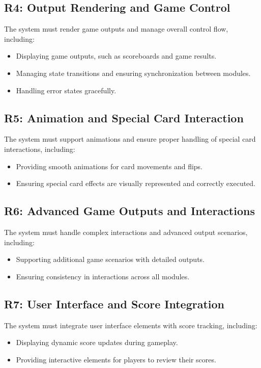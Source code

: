 \documentclass[12pt, titlepage]{article}
\begin{document}
\subsection{R4: Output Rendering and Game Control}
The system must render game outputs and manage overall control flow, including:
\begin{itemize}
    \item Displaying game outputs, such as scoreboards and game results.
    \item Managing state transitions and ensuring synchronization between modules.
    \item Handling error states gracefully.
\end{itemize}

\subsection{R5: Animation and Special Card Interaction}
The system must support animations and ensure proper handling of special card interactions, including:
\begin{itemize}
    \item Providing smooth animations for card movements and flips.
    \item Ensuring special card effects are visually represented and correctly executed.
\end{itemize}

\subsection{R6: Advanced Game Outputs and Interactions}
The system must handle complex interactions and advanced output scenarios, including:
\begin{itemize}
    \item Supporting additional game scenarios with detailed outputs.
    \item Ensuring consistency in interactions across all modules.
\end{itemize}

\subsection{R7: User Interface and Score Integration}
The system must integrate user interface elements with score tracking, including:
\begin{itemize}
    \item Displaying dynamic score updates during gameplay.
    \item Providing interactive elements for players to review their scores.
\end{itemize}
\end{document}
